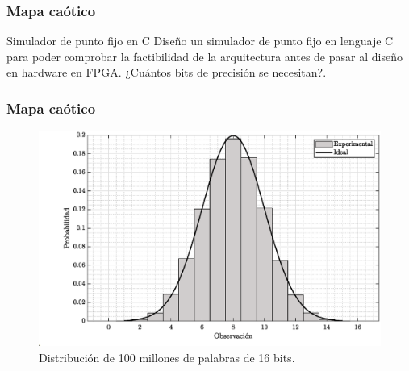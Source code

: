 \documentclass[10pt]{beamer}
\begin{document}
\begin{frame}
    \frametitle{Mapa caótico}
    \begin{block}{Simulador de punto fijo en C}
        \justifying
         Diseño un simulador de punto fijo en lenguaje C para poder comprobar la factibilidad de la arquitectura antes de pasar al diseño en hardware en FPGA. ¿Cuántos bits de precisión se necesitan?.
        
        \begin{table}[htbp]
            \centering
            \caption{Número de bits usados en la implementación de cada uno de los atractores con aritmética de punto fijo.}
            \label{tab:bits_atractores}
        \end{table}

	\end{block}
\end{frame}


\begin{frame}
    \frametitle{Mapa caótico}
	\begin{figure}[hbtp]
            \centering
            \includegraphics[width=0.8\linewidth]{J0_distribucion_exp}
            \caption{Distribución de 100 millones de palabras de 16 bits.}
            \label{fig:J0_distribucion_exp}
        \end{figure}
\end{frame}
\end{document}
